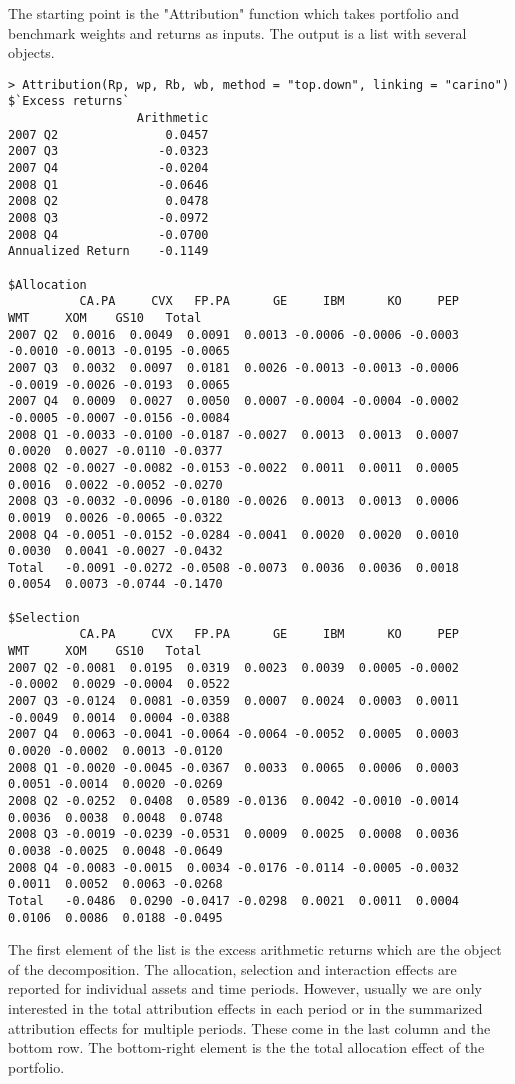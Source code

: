 \documentclass[11pt,a4paper]{article}
\begin{document}
The starting point is the "Attribution" function which takes portfolio and benchmark weights and returns as inputs. The output is a list with several objects.
\begingroup
\fontsize{9pt}{12pt}\selectfont
\begin{verbatim}
> Attribution(Rp, wp, Rb, wb, method = "top.down", linking = "carino")
$`Excess returns`
                  Arithmetic
2007 Q2               0.0457
2007 Q3              -0.0323
2007 Q4              -0.0204
2008 Q1              -0.0646
2008 Q2               0.0478
2008 Q3              -0.0972
2008 Q4              -0.0700
Annualized Return    -0.1149

$Allocation
          CA.PA     CVX   FP.PA      GE     IBM      KO     PEP     WMT     XOM    GS10   Total
2007 Q2  0.0016  0.0049  0.0091  0.0013 -0.0006 -0.0006 -0.0003 -0.0010 -0.0013 -0.0195 -0.0065
2007 Q3  0.0032  0.0097  0.0181  0.0026 -0.0013 -0.0013 -0.0006 -0.0019 -0.0026 -0.0193  0.0065
2007 Q4  0.0009  0.0027  0.0050  0.0007 -0.0004 -0.0004 -0.0002 -0.0005 -0.0007 -0.0156 -0.0084
2008 Q1 -0.0033 -0.0100 -0.0187 -0.0027  0.0013  0.0013  0.0007  0.0020  0.0027 -0.0110 -0.0377
2008 Q2 -0.0027 -0.0082 -0.0153 -0.0022  0.0011  0.0011  0.0005  0.0016  0.0022 -0.0052 -0.0270
2008 Q3 -0.0032 -0.0096 -0.0180 -0.0026  0.0013  0.0013  0.0006  0.0019  0.0026 -0.0065 -0.0322
2008 Q4 -0.0051 -0.0152 -0.0284 -0.0041  0.0020  0.0020  0.0010  0.0030  0.0041 -0.0027 -0.0432
Total   -0.0091 -0.0272 -0.0508 -0.0073  0.0036  0.0036  0.0018  0.0054  0.0073 -0.0744 -0.1470

$Selection
          CA.PA     CVX   FP.PA      GE     IBM      KO     PEP     WMT     XOM    GS10   Total
2007 Q2 -0.0081  0.0195  0.0319  0.0023  0.0039  0.0005 -0.0002 -0.0002  0.0029 -0.0004  0.0522
2007 Q3 -0.0124  0.0081 -0.0359  0.0007  0.0024  0.0003  0.0011 -0.0049  0.0014  0.0004 -0.0388
2007 Q4  0.0063 -0.0041 -0.0064 -0.0064 -0.0052  0.0005  0.0003  0.0020 -0.0002  0.0013 -0.0120
2008 Q1 -0.0020 -0.0045 -0.0367  0.0033  0.0065  0.0006  0.0003  0.0051 -0.0014  0.0020 -0.0269
2008 Q2 -0.0252  0.0408  0.0589 -0.0136  0.0042 -0.0010 -0.0014  0.0036  0.0038  0.0048  0.0748
2008 Q3 -0.0019 -0.0239 -0.0531  0.0009  0.0025  0.0008  0.0036  0.0038 -0.0025  0.0048 -0.0649
2008 Q4 -0.0083 -0.0015  0.0034 -0.0176 -0.0114 -0.0005 -0.0032  0.0011  0.0052  0.0063 -0.0268
Total   -0.0486  0.0290 -0.0417 -0.0298  0.0021  0.0011  0.0004  0.0106  0.0086  0.0188 -0.0495
\end{verbatim}
\endgroup
The first element of the list is the excess arithmetic returns which are the object of the decomposition. The allocation, selection and interaction effects are reported for individual assets and time periods. However, usually we are only interested in the total attribution effects in each period or in the summarized attribution effects for multiple periods. These come in the last column and the bottom row. The bottom-right element is the the total allocation effect of the portfolio.
\end{document}
